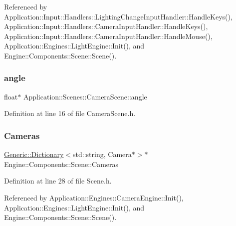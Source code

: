 Referenced by Application\+::\+Input\+::\+Handlers\+::\+Lighting\+Change\+Input\+Handler\+::\+Handle\+Keys(), Application\+::\+Input\+::\+Handlers\+::\+Camera\+Input\+Handler\+::\+Handle\+Keys(), Application\+::\+Input\+::\+Handlers\+::\+Camera\+Input\+Handler\+::\+Handle\+Mouse(), Application\+::\+Engines\+::\+Light\+Engine\+::\+Init(), and Engine\+::\+Components\+::\+Scene\+::\+Scene().

\mbox{\label{classApplication_1_1Scenes_1_1CameraScene_a5b1ed7cbc9e95f0adf9f9ad9a9100d51}} 
\subsubsection{\texorpdfstring{angle}{angle}}
{\footnotesize\ttfamily float$\ast$ Application\+::\+Scenes\+::\+Camera\+Scene\+::angle\hspace{0.3cm}{\ttfamily [private]}}



Definition at line 16 of file Camera\+Scene.\+h.

\mbox{\label{classEngine_1_1Components_1_1Scene_aea98ff1ced88ee859878b504e9a2a362}} 
\subsubsection{\texorpdfstring{Cameras}{Cameras}}
{\footnotesize\ttfamily \mbox{\hyperlink{classGeneric_1_1Dictionary}{Generic\+::\+Dictionary}}$<$std\+::string, Camera$\ast$$>$$\ast$ Engine\+::\+Components\+::\+Scene\+::\+Cameras\hspace{0.3cm}{\ttfamily [inherited]}}



Definition at line 28 of file Scene.\+h.



Referenced by Application\+::\+Engines\+::\+Camera\+Engine\+::\+Init(), Application\+::\+Engines\+::\+Light\+Engine\+::\+Init(), and Engine\+::\+Components\+::\+Scene\+::\+Scene().

